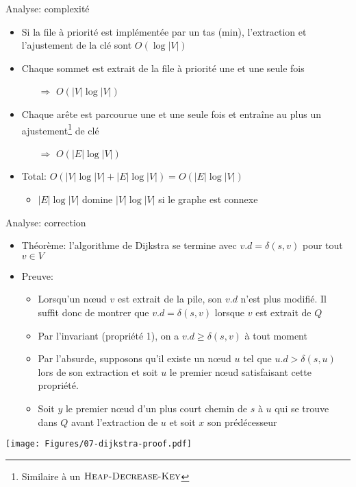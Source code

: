 \begin{frame}{Analyse: complexité}

\begin{itemize}
\item Si la file à priorité est implémentée par un tas (min), l'extraction et l'ajustement de la clé sont $O(\log |V|)$
\item Chaque sommet est extrait de la file à priorité une et une seule fois
\begin{itemize}
\item[$\Rightarrow$] $O(|V|\log |V|)$
\end{itemize}
\item Chaque arête est parcourue une et une seule fois et entraîne au plus un ajustement\footnote{Similaire à un $\textnormal{\scshape Heap-Decrease-Key}$} de clé
\begin{itemize}
\item[$\Rightarrow$] $O(|E|\log |V|)$
\end{itemize}
\item Total: $O(|V|\log |V| + |E|\log |V|)=O(|E| \log |V|)$
\begin{itemize}
\item $|E| \log |V|$ domine $|V|\log |V|$ si le graphe est connexe
\end{itemize}
\end{itemize}

\end{frame}


\begin{frame}{Analyse: correction}
\begin{itemize}
\item \alert{Théorème}: l'algorithme de Dijkstra se termine avec $v.d=\delta(s,v)$ pour tout $v\in V$
\item \alert{Preuve}:
\begin{itemize}
\item Lorsqu'un n\oe ud $v$ est extrait de la pile, son $v.d$ n'est plus modifié. Il suffit donc de montrer que $v.d=\delta(s,v)$ lorsque $v$ est extrait de $Q$
\item Par l'invariant (propriété 1), on a $v.d\geq \delta(s,v)$ à tout moment
\item Par l'absurde, supposons qu'il existe un n\oe ud $u$ tel que $u.d>\delta(s,u)$ lors de son extraction et soit $u$ le premier n\oe ud satisfaisant cette propriété.
\item Soit $y$ le premier n\oe ud d'un plus court chemin de $s$ à $u$ qui se trouve dans $Q$ avant l'extraction de $u$ et soit $x$ son prédécesseur
\end{itemize}
\end{itemize}

\centerline{\texttt{[image: Figures/07-dijkstra-proof.pdf]}}


\end{frame}

